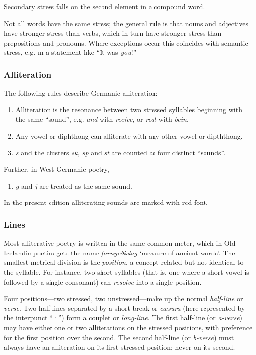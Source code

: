     Secondary stress falls on the second element in a compound word.

    Not all words have the same stress; the general rule is that nouns and adjectives have stronger stress than verbs, which in turn have stronger stress than prepositions and pronouns.  Where exceptions occur this coincides with semantic stress, e.g. in a statement like “It was \emph{you}!”

    \subsubsection{Alliteration}
    The following rules describe Germanic alliteration:

    \begin{enumerate}
      \item Alliteration is the resonance between two stressed syllables beginning with the same “sound”, e.g. \emph{and} with \emph{reeive}, or \emph{reat} with \emph{bein}.
      \item Any vowel or diphthong can alliterate with any other vowel or dipththong.
      \item \emph{s} and the clusters \emph{sk, sp} and \emph{st} are counted as four distinct “sounds”.
    \end{enumerate}

    \noindent Further, in West Germanic poetry,

    \begin{enumerate}[4]
      \item \emph{g} and \emph{j} are treated as the same sound.
    \end{enumerate}

    In the present edition alliterating sounds are marked with red font.

    \subsubsection{Lines}
    Most alliterative poetry is written in the same common meter, which in Old Icelandic poetics gets the name \emph{fornyrðislag} ‘measure of ancient words’.  The smallest metrical division is the \emph{position}, a concept related but not identical to the syllable.  For instance, two short syllables (that is, one where a short vowel is followed by a single consonant) can \emph{resolve} into a single position.

    Four positions—two stressed, two unstressed—make up the normal \emph{half-line} or \emph{verse}.  Two half-lines separated by a short break or \emph{cæsura} (here represented by the interpunct “·”) form a couplet or \emph{long-line}.  The first half-line (or \emph{a-verse}) may have either one or two alliterations on the stressed positions, with preference for the first position over the second.  The second half-line (or \emph{b-verse}) must always have an alliteration on its first stressed position; never on its second.

